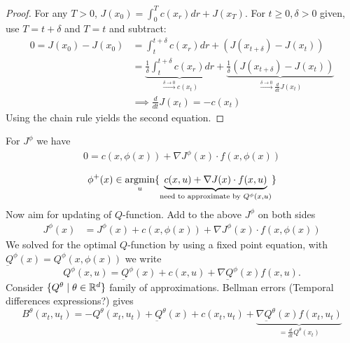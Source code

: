 \begin{proof}
    For any \(T>0\), \(J(x_0)=\int_0^Tc(x_r)dr+J(x_T)\). For \(t\geq 0,\delta>0\) given,
    use \(T=t+\delta\) and \(T=t\) and subtract:
    \begin{align*}
        0=J(x_0)-J(x_0)&=\int_t^{t+\delta}c(x_r)dr+(J(x_{t+\delta})-J(x_t))\\
        &=\underbrace{\frac{1}{\delta}\int_t^{t+\delta}c(x_r)dr}_{\stackrel{\delta\to 0}{\to}c(x_t)}+\underbrace{\frac{1}{\delta}(J(x_{t+\delta})-J(x_t))}_{\stackrel{\delta\to 0}{\to}\frac{d}{dt}J(x_t)}\\
        &\implies \frac{d}{dt}J(x_t)=-c(x_t)
    \end{align*}
    Using the chain rule yields the second equation.
\end{proof}

For \(J^\phi\) we have 
\begin{align*}
    0=c(x,\phi(x))+\nabla J^\phi(x)\cdot f(x,\phi(x))
\end{align*}

\[\phi^+(x)\in \operatorname*{\text{argmin}}_{u}\{\underbrace{c(x,u)+\nabla J(x)\cdot f(x,u)}_{\text{need to approximate by }Q^\phi(x,u)}\}\]
Now aim for updating of \(Q\)-function. Add to the above \(J^\phi\) on both sides 
\begin{align*}
    J^\phi(x)&=J^\phi(x)+c(x,\phi(x))+\nabla J^\phi(x)\cdot f(x,\phi(x))        
\end{align*}
We solved for the optimal \(Q\)-function by using a fixed point equation,
with \(\underbar{Q}^\phi(x)=Q^\phi(x,\phi(x))\) we write 
\[Q^\phi(x,u)=\underbar{Q}^\phi(x)+c(x,u)+\nabla \underbar{Q}^\phi(x)f(x,u).\]
Consider \(\{Q^\theta\mid \theta\in \mathbb{R}^d\}\) family of approximations. 
Bellman errors (Temporal differences expressions?) gives 
\begin{equation}\label{eq:bellman_error_policy_improvement_continuous}
    B^\theta(x_t,u_t)=-Q^\theta(x_t,u_t)+\underbar{Q}^\theta(x)+c(x_t,u_t)+\underbrace{\nabla\underbar{Q}^\theta(x) f(x_t,u_t)}_{=\frac{d}{dt}Q^\theta(x_t)}
\end{equation}


